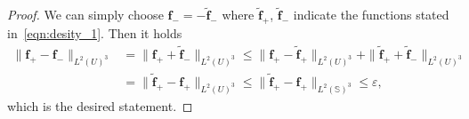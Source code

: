 \documentclass[10pt,a4paper]{amsart}
\renewcommand{\SS}{\mathbb{S}}
\newcommand{\eps}{\varepsilon}
\newcommand{\f}{\mathbf{f}}
\begin{document}
\begin{proof}
    We can simply choose $\f_-=-\tilde{\f}_-$ where $\tilde{\f}_+$, $\tilde{\f}_-$ indicate the functions stated in~\eqref{eqn:desity_1}. Then it holds 
    \begin{align*}
         \|\f_+ - \f_-\|_{L^2(U)^3}&=  \|\f_+ + \tilde{\f}_-\|_{L^2(U)^3} \leq \|\f_+ - \tilde{\f}_+\|_{L^2(U)^3} + \|\tilde{\f}_+ + \tilde{\f}_-\|_{L^2(U)^3}
         \\&=\|\tilde{\f}_+ - \f_+\|_{L^2(U)^3}\leq \|\tilde{\f}_+-\f_+\|_{L^2(\SS)^3}\leq \eps,
    \end{align*}
    which is the desired statement.
\end{proof}
\end{document}
